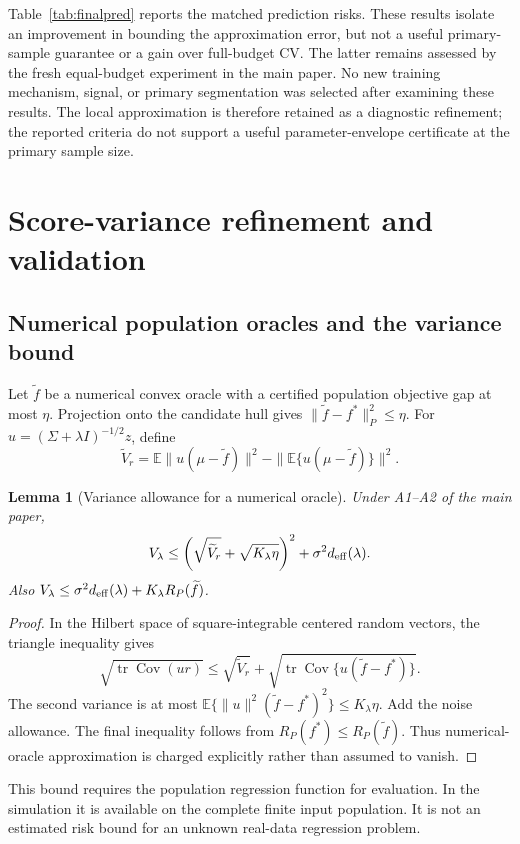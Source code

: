 \documentclass[pdflatex,sn-mathphys-ay]{sn-jnl}
\newtheorem{pathlemma}{Lemma}\renewcommand{\thepathlemma}{S\arabic{pathlemma}}
\theoremstyle{remark}\newtheorem{remark}[theorem]{Remark}
\newcommand{\E}{\mathbb E}
\newcommand{\tr}{\operatorname{tr}}
\begin{document}
Table~\ref{tab:finalpred} reports the matched prediction risks. These results isolate an improvement in bounding the approximation error, but not a useful primary-sample guarantee or a gain over full-budget CV. The latter remains assessed by the fresh equal-budget experiment in the main paper. No new training mechanism, signal, or primary segmentation was selected after examining these results. The local approximation is therefore retained as a diagnostic refinement; the reported criteria do not support a useful parameter-envelope certificate at the primary sample size.

\section{Score-variance refinement and validation}\label{sec:scoreaudit}
\subsection{Numerical population oracles and the variance bound}
Let $\widetilde f$ be a numerical convex oracle with a certified population objective gap at most $\eta$. Projection onto the candidate hull gives $\|\widetilde f-f^*\|_P^2\leq\eta$. For $u=(\Sigma+\lambda I)^{-1/2}z$, define
\[
 \widetilde V_r=\E\|u(\mu-\widetilde f)\|^2
 -\|\E\{u(\mu-\widetilde f)\}\|^2.
\]
\begin{pathlemma}[Variance allowance for a numerical oracle]
Under A1--A2 of the main paper,
\[
 V_\lambda\leq
 \left(\sqrt{\widetilde V_r}+\sqrt{K_\lambda\eta}\right)^2
 +\sigma^2d_{\rm eff}(\lambda).
\]
Also $V_\lambda\leq\sigma^2d_{\rm eff}(\lambda)+K_\lambda R_P(\widetilde f)$.
\end{pathlemma}
\begin{proof}
In the Hilbert space of square-integrable centered random vectors, the triangle inequality gives
\[
 \sqrt{\tr\operatorname{Cov}(ur)}
 \leq\sqrt{\widetilde V_r}
 +\sqrt{\tr\operatorname{Cov}\{u(\widetilde f-f^*)\}}.
\]
The second variance is at most $\E\{\|u\|^2(\widetilde f-f^*)^2\}\leq K_\lambda\eta$. Add the noise allowance. The final inequality follows from $R_P(f^*)\leq R_P(\widetilde f)$. Thus numerical-oracle approximation is charged explicitly rather than assumed to vanish.
\end{proof}
This bound requires the population regression function for evaluation. In the simulation it is available on the complete finite input population. It is not an estimated risk bound for an unknown real-data regression problem.
\end{document}
